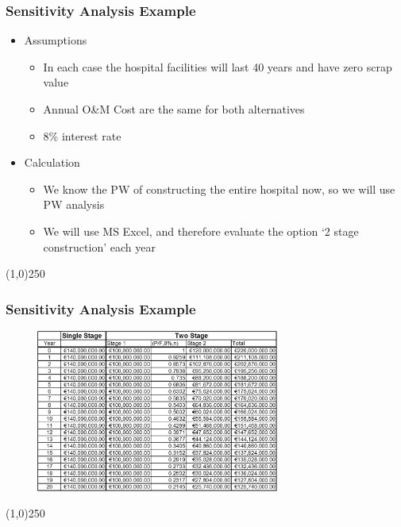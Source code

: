 			 
\begin{frame}
\frametitle{Sensitivity Analysis Example}
\begin{itemize}
\item Assumptions
\begin{itemize}
	\item In each case the hospital facilities will last 40 years and have zero scrap value
\item Annual O\&M Cost are the same for both alternatives
\item 8\% interest rate
\end{itemize}
\item Calculation
\begin{itemize}
	\item We know the PW of constructing the entire hospital now, so we will use PW analysis
\item We will use MS Excel, and therefore evaluate the option `2 stage construction' each year
\end{itemize}
\end{itemize}
\end{frame}\begin{center}\line(1,0){250}\end{center}





\begin{frame}
\frametitle{Sensitivity Analysis Example}
\begin{figure}
	\centering
		\includegraphics[width = 8cm]{images/table.jpg}
	\label{fig:sens1}
\end{figure}
\end{frame}\begin{center}\line(1,0){250}\end{center}





